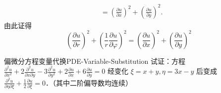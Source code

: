 \begin{myproof}
\begin{equation}
\begin{aligned}
                                                                                                                          & = \left( \frac{\partial u}{\partial x} \right)^2 + \left( \frac{\partial u}{\partial y} \right)^2.
        \end{aligned}
    \end{equation}
    由此证得
    \begin{equation}
        \boxed{\left(\frac{\partial u}{\partial r}\right)^2 + \left(\frac{1}{r} \frac{\partial u}{\partial \varphi}\right)^2 = \left(\frac{\partial u}{\partial x}\right)^2 + \left(\frac{\partial u}{\partial y}\right)^2}
    \end{equation}
\end{myproof}

\begin{problem}{偏微分方程变量代换}{PDE-Variable-Substitution}
    试证：方程 $\frac{\partial^2 u}{\partial x^2} + 2 \frac{\partial^2 u}{\partial x \partial y} - 3 \frac{\partial^2 u}{\partial y^2} + 2 \frac{\partial u}{\partial x} + 6 \frac{\partial u}{\partial y} = 0$ 经变化 $\xi = x + y, \eta = 3x - y$ 后变成 $\frac{\partial^2 u}{\partial \eta \partial \xi} + \frac{1}{2} \frac{\partial u}{\partial \xi} = 0$．（其中二阶偏导数均连续）
\end{problem}

